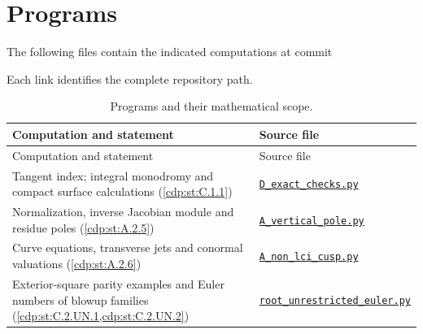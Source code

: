\section*{Programs}
The following files contain the indicated computations at commit
\begin{center}\small\ttfamily\SsixRepositoryCommit\end{center}
Each link identifies the complete repository path.

{\footnotesize
\renewcommand{\arraystretch}{.9}
\setlength{\tabcolsep}{4pt}
\begin{longtable}{@{}>{\raggedright\arraybackslash}p{}>{\raggedright\arraybackslash}p{}@{}}
\caption{Programs and their mathematical scope.}\label{tab:II:programs}\\
\toprule Computation and statement & Source file \\
\midrule\endfirsthead
\toprule Computation and statement & Source file \\
\midrule\endhead
\bottomrule\endfoot
Tangent index; integral monodromy and compact surface calculations (\cref{cdp:st:C.1.1}) & \href{https://raw.githubusercontent.com/KokunoYumeto/s6-complex-structure-workbench/\SsixRepositoryCommit/pro_returns/S6_03_CDP_checkpoint_13_20261116T0136Z/S6_03_CDP/code/D_exact_checks.py}{\nolinkurl{D_exact_checks.py}} \\[3pt]
Normalization, inverse Jacobian module and residue poles (\cref{cdp:st:A.2.5}) & \href{https://raw.githubusercontent.com/KokunoYumeto/s6-complex-structure-workbench/\SsixRepositoryCommit/pro_returns/S6_03_CDP_checkpoint_13_20261116T0136Z/S6_03_CDP/code/A_vertical_pole.py}{\nolinkurl{A_vertical_pole.py}} \\[3pt]
Curve equations, transverse jets and conormal valuations (\cref{cdp:st:A.2.6}) & \href{https://raw.githubusercontent.com/KokunoYumeto/s6-complex-structure-workbench/\SsixRepositoryCommit/pro_returns/S6_03_CDP_checkpoint_13_20261116T0136Z/S6_03_CDP/code/A_non_lci_cusp.py}{\nolinkurl{A_non_lci_cusp.py}} \\[3pt]
Exterior-square parity examples and Euler numbers of blowup families (\cref{cdp:st:C.2.UN.1,cdp:st:C.2.UN.2}) & \href{https://raw.githubusercontent.com/KokunoYumeto/s6-complex-structure-workbench/\SsixRepositoryCommit/pro_returns/S6_03_CDP_checkpoint_13_20261116T0136Z/S6_03_CDP/code/root_unrestricted_euler.py}{\nolinkurl{root_unrestricted_euler.py}} \\[3pt]
\end{longtable}}

